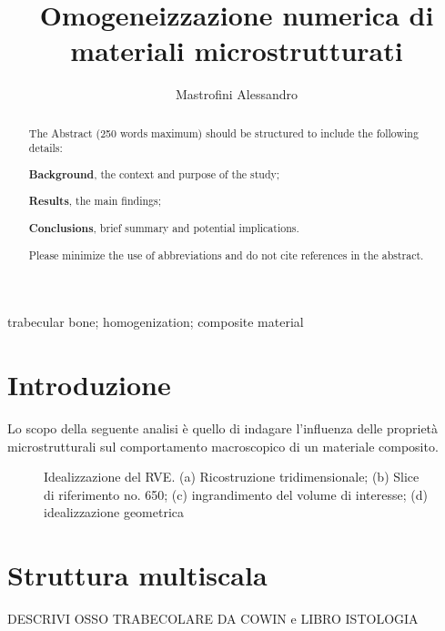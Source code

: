 \documentclass[a4paper,num-refs]{oup-contemporary}
\title{Omogeneizzazione numerica di materiali microstrutturati}
\author{Mastrofini Alessandro}
\begin{document}
\begin{frontmatter}
\maketitle
\begin{abstract}
The Abstract (250 words maximum) should be structured to include the following details:

 \textbf{Background}, the context and purpose of the study;
 
  \textbf{Results}, the main findings;
  
   \textbf{Conclusions}, brief summary and potential implications. 
   
   Please minimize the use of abbreviations and do not cite references in the abstract.
\end{abstract}

\begin{keywords}
trabecular bone; homogenization; composite material
\end{keywords}
\end{frontmatter}



\section{Introduzione}

Lo scopo della seguente analisi è quello di indagare l'influenza delle proprietà microstrutturali sul comportamento macroscopico di un materiale composito.




\begin{figure}%
	\centering
	\def\svgwidth{\textwidth}
	
	\caption{Idealizzazione del RVE. (a) Ricostruzione tridimensionale; (b) Slice di riferimento no. 650; (c) ingrandimento del volume di interesse; (d) idealizzazione geometrica} 
	
\label{fig:homogen_RVE}
\end{figure}


\section{Struttura multiscala}


DESCRIVI OSSO TRABECOLARE DA COWIN e LIBRO ISTOLOGIA

\textcolor{blue}{\lipsum[1-8]}
\end{document}
